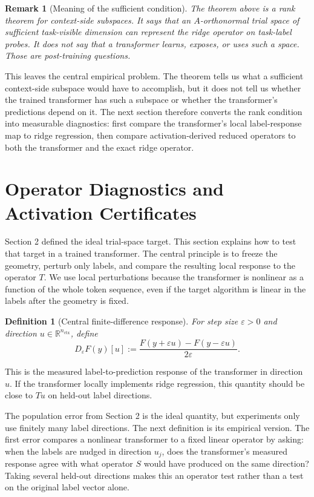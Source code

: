 \documentclass[11pt]{article}
\newtheorem{definition}{Definition}
\newtheorem{remark}{Remark}
\newcommand{\R}{\mathbb{R}}
\begin{document}
\begin{remark}[Meaning of the sufficient condition]
The theorem above is a rank theorem for context-side subspaces. It says that an \(A\)-orthonormal trial
space of sufficient task-visible dimension can represent the ridge operator on task-label probes. It
does not say that a transformer learns, exposes, or uses such a space. Those are post-training
questions.
\end{remark}

This leaves the central empirical problem. The theorem tells us what a sufficient context-side
subspace would have to accomplish, but it does not tell us whether the trained transformer has
such a subspace or whether the transformer's predictions depend on it. The next section therefore
converts the rank condition into measurable diagnostics: first compare the transformer's local
label-response map to ridge regression, then compare activation-derived reduced operators to both
the transformer and the exact ridge operator.

\section{Operator Diagnostics and Activation Certificates}

Section 2 defined the ideal trial-space target. This section explains how to test that target in
a trained transformer. The central principle is to freeze the geometry, perturb only labels, and
compare the resulting local response to the operator \(T\). We use local perturbations because the
transformer is nonlinear as a function of the whole token sequence, even if the target algorithm is
linear in the labels after the geometry is fixed.

\begin{definition}[Central finite-difference response]
For step size \(\varepsilon>0\) and direction \(u\in\R^{n_{\mathrm{ctx}}}\), define
\[
D_\varepsilon F(y)[u]
:=
\frac{F(y+\varepsilon u)-F(y-\varepsilon u)}{2\varepsilon}.
\]
\end{definition}
This is the measured label-to-prediction response of the transformer in direction \(u\). If the
transformer locally implements ridge regression, this quantity should be close to \(Tu\) on held-out
label directions.

The population error from Section 2 is the ideal quantity, but experiments only use finitely many
label directions. The next definition is its empirical version. The first error compares a nonlinear
transformer to a fixed linear operator by asking: when the labels are nudged in direction \(u_j\),
does the transformer's measured response agree with what operator \(S\) would have produced on
the same direction? Taking several held-out directions makes this an operator test rather than a
test on the original label vector alone.
\end{document}
